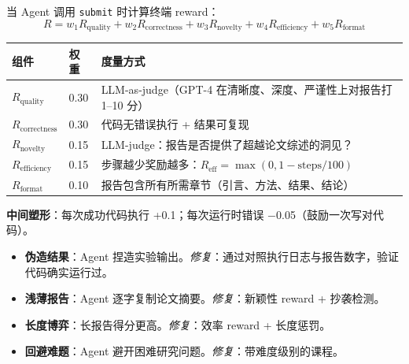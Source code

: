 \begin{keybox}[多组件研究 Reward]
当 Agent 调用 \texttt{submit} 时计算终端 reward：
\[
R = w_1 R_{\text{quality}} + w_2 R_{\text{correctness}} + w_3 R_{\text{novelty}} + w_4 R_{\text{efficiency}} + w_5 R_{\text{format}}
\]

\noindent\begin{tabularx}{\linewidth}{@{}l Z{0.3} Z{1.7}@{}}
\toprule
\textbf{组件} & \textbf{权重} & \textbf{度量方式} \\
\midrule
$R_{\text{quality}}$ & 0.30 & LLM-as-judge（GPT-4 在清晰度、深度、严谨性上对报告打 1--10 分） \\
$R_{\text{correctness}}$ & 0.30 & 代码无错误执行 + 结果可复现 \\
$R_{\text{novelty}}$ & 0.15 & LLM-judge：报告是否提供了超越论文综述的洞见？ \\
$R_{\text{efficiency}}$ & 0.15 & 步骤越少奖励越多：$R_{\text{eff}} = \max(0, 1 - \text{steps}/100)$ \\
$R_{\text{format}}$ & 0.10 & 报告包含所有所需章节（引言、方法、结果、结论） \\
\bottomrule
\end{tabularx}

\textbf{中间塑形}：每次成功代码执行 +0.1；每次运行时错误 $-$0.05（鼓励一次写对代码）。
\end{keybox}

\begin{warningbox}
\begin{itemize}
  \item \textbf{伪造结果}：Agent 捏造实验输出。\emph{修复}：通过对照执行日志与报告数字，验证代码确实运行过。
  \item \textbf{浅薄报告}：Agent 逐字复制论文摘要。\emph{修复}：新颖性 reward + 抄袭检测。
  \item \textbf{长度博弈}：长报告得分更高。\emph{修复}：效率 reward + 长度惩罚。
  \item \textbf{回避难题}：Agent 避开困难研究问题。\emph{修复}：带难度级别的课程。
\end{itemize}
\end{warningbox}

